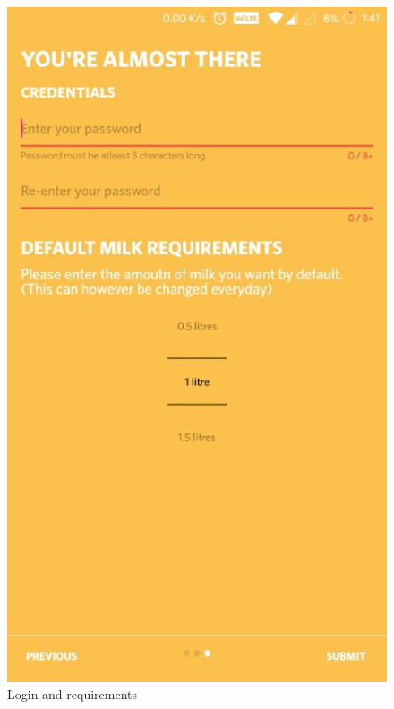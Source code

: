 \begin{figure}[h]
  \begin{center}
\includegraphics[scale=0.6]{3/four.jpeg}
\caption{Login and requirements}
\label{fig:two}
\end{center}
\end{figure}

